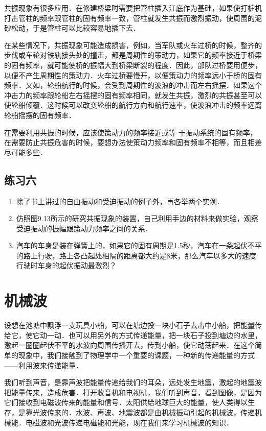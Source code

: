 共振现象有很多应用．在修建桥梁时需要把管柱插入江底作为基础，如果使打桩机打击管柱的频率跟管柱的固有频率一致，管柱就发生共振而激烈振动，使周围的泥砂松动，于是管柱可以比较容易地插下去．

在某些情况下，共振现象可能造成损害，例如，当军队或火车过桥的时候，整齐的步伐或车轮对铁轨接头处的撞击，都是周期性的策动力，如果它的频率接近于桥梁的固有频率，就可能使桥的振幅大到桥梁断裂的程度．因此，部队过桥要用便步，以便不产生周期性的策动力．火车过桥要慢开，以便策动力的频率远小于桥的固有频率．又如，轮船航行的时候，会受到周期性的波浪的冲击而左右摇摆．如果这个冲击力的频率跟轮船左右摇摆的固有频率相同，就发生共振，激烈的共振甚至可以使轮船倾覆．这时候可以改变轮船的航行方向和航行速率，使波浪冲击的频率远离轮船摇摆的固有频率．

在需要利用共振的时候，应该使策动力的频率接近或等
于振动系统的固有频率，在需要防止共振危害的时候，要想办法使策动力频率和固有频率不相等，而且相差尽可能多些．

\subsection*{练习六}
\begin{enumerate}
    \item 除了书上讲过的自由振动和受迫振动的例子外，再各举两个实例．
    \item 仿照图9.13所示的研究共振现象的装置，自己利用手边的材料来做实验，观察受迫振动的振幅跟策动力频率之间的关系．
    \item 汽车的车身是装在弹簧上的，如果它的固有周期是1.5秒，汽车在一条起伏不平的路上行驶，路上各凸起处相隔的距离都大约是8米，那么汽车以多大的速度行驶时车身的起伏振动最激烈？
\end{enumerate}


\section{机械波}
设想在池塘中飘浮一支玩具小船，可以在塘边投一块小石子去击中小船，把能量传给它，使它动一动．也可以用另外的方式传递能量，把一块石子投到塘边的水里，激起一圈圈起伏不平的水波向周围传播开去，传到小船，使它动荡起来．在这个简单的现象中，我们接触到了物理学中一个重要的课题，一种新的传递能量的方式——利用波来传递能量．

我们听到声音，是靠声波把能量传递给我们的耳朵，远处发生地震，激起的地震波把能量传来，造成危害．打开收音机和电视机，我们听到声音，看到图像，是因为它们接收到电磁波传来的能量和信号．太阳供给地球巨大的能量，使人类得以生存，是靠光波传来的．水波、声波、地震波都是由机械振动引起的机械波，传递机械能．电磁波和光波传递电磁能和光能，现在我们来学习机械波的知识．


